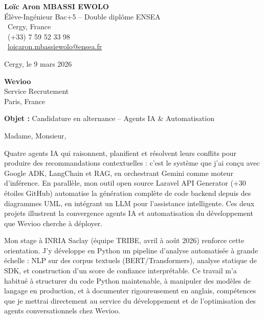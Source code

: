 \documentclass[a4paper,11pt]{article}
\begin{document}
\noindent
\begin{minipage}[t]{0.5\textwidth}
    \textbf{Loïc Aron MBASSI EWOLO}\\
    Élève-Ingénieur Bac+5 -- Double diplôme ENSEA\\[3pt]
    \faMapMarker\ Cergy, France\\
    \faPhone\ (+33) 7 59 52 33 98\\
    \faEnvelope\ \href{mailto:loicaron.mbassiewolo@ensea.fr}{loicaron.mbassiewolo@ensea.fr}
\end{minipage}
\hfill
\begin{minipage}[t]{0.4\textwidth}
    \raggedleft
    Cergy, le 9 mars 2026
\end{minipage}

\vspace{1.2cm}

\hfill
\begin{minipage}[t]{0.5\textwidth}
    \raggedleft
    \textbf{Wevioo}\\
    Service Recrutement\\
    Paris, France
\end{minipage}

\vspace{1cm}

\noindent\textbf{Objet :} Candidature en alternance -- Agents IA \& Automatisation

\vspace{0.8cm}

Madame, Monsieur,

Quatre agents IA qui raisonnent, planifient et résolvent leurs conflits pour produire des recommandations contextuelles : c'est le système que j'ai conçu avec Google ADK, LangChain et RAG, en orchestrant Gemini comme moteur d'inférence. En parallèle, mon outil open source Laravel API Generator (+30 étoiles GitHub) automatise la génération complète de code backend depuis des diagrammes UML, en intégrant un LLM pour l'assistance intelligente. Ces deux projets illustrent la convergence agents IA et automatisation du développement que Wevioo cherche à déployer.

Mon stage à INRIA Saclay (équipe TRIBE, avril à août 2026) renforce cette orientation. J'y développe en Python un pipeline d'analyse automatisée à grande échelle : NLP sur des corpus textuels (BERT/Transformers), analyse statique de SDK, et construction d'un score de confiance interprétable. Ce travail m'a habitué à structurer du code Python maintenable, à manipuler des modèles de langage en production, et à documenter rigoureusement en anglais, compétences que je mettrai directement au service du développement et de l'optimisation des agents conversationnels chez Wevioo.
\end{document}
